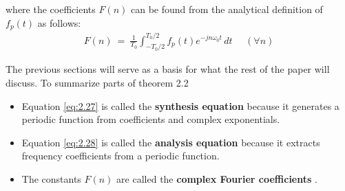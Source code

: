 \documentclass[10pt]{article}
\begin{document}
where the coefficients $F(n)$ can be found from the analytical definition of $f_p(t)$ as follows:
\begin{equation} \label{eq:2.28}
\begin{aligned}
    F(n) \: = \: \frac{1}{T_0}\int_{-T_0/2}^{T_0/2} f_p(t) e^{-jn\omega_0t} \,dt \:\:\:\:\:\: (\forall n)
\end{aligned}
\end{equation}

The previous sections will serve as a basis for what the rest of the paper will discuss. To summarize parts of theorem 2.2
\begin{itemize}
    \item Equation \eqref{eq:2.27} is called the \textbf{synthesis equation} because it generates a periodic function from coefficients and complex exponentials.
    \item Equation \eqref{eq:2.28} is called the \textbf{analysis equation} because it extracts frequency coefficients from a periodic function.
    \item The constants $F(n)$ are called the \textbf{complex Fourier coefficients} \cite{morrison1994fourier}.
\end{itemize}


\end{document}

